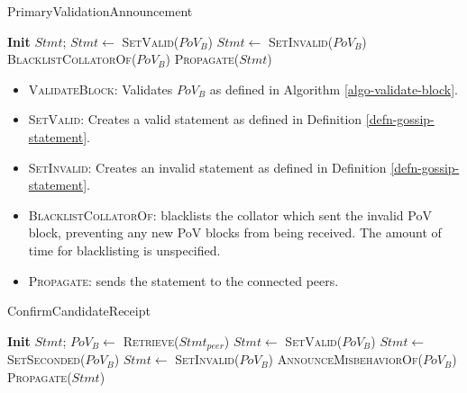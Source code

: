 \begin{algorithm}[H]
  \caption[PrimaryValidationAnnouncement]{\sc PrimaryValidationAnnouncement}
  \label{algo-primary-validation-announcement}
  \begin{algorithmic}[1]
      \State \textbf{Init} $Stmt$;
        \State $Stmt \leftarrow$ \textsc{SetValid($PoV_B$)}
      \Else
        \State $Stmt \leftarrow$ \textsc{SetInvalid($PoV_B$)}
        \State \textsc{BlacklistCollatorOf}($PoV_B$)
      \EndIf
      \State \textsc{Propagate}($Stmt$)
  \end{algorithmic}
\end{algorithm}

\begin{itemize}
  \item \textsc{ValidateBlock}: Validates $PoV_B$ as defined in Algorithm
  \ref{algo-validate-block}.
  \item \textsc{SetValid}: Creates a valid statement as defined in Definition
  \ref{defn-gossip-statement}.
  \item \textsc{SetInvalid}: Creates an invalid statement as defined in
  Definition \ref{defn-gossip-statement}.
  \item \textsc{BlacklistCollatorOf}: blacklists the collator which sent the
  invalid PoV block, preventing any new PoV blocks from being received. The
  amount of time for blacklisting is unspecified.
  \item \textsc{Propagate}: sends the statement to the connected peers.
\end{itemize}

\begin{algorithm}[H]
  \caption[]{\sc ConfirmCandidateReceipt}
  \label{algo-endorse-candidate-receipt}
  \begin{algorithmic}[1]
      \State \textbf{Init} $Stmt$;
      \State $PoV_B \leftarrow$ \textsc{Retrieve}($Stmt_{peer}$)
          \State $Stmt \leftarrow$ \textsc{SetValid($PoV_B$)}
        \Else
          \State $Stmt \leftarrow$ \textsc{SetSeconded($PoV_B$)}
        \EndIf
      \Else
        \State $Stmt \leftarrow$ \textsc{SetInvalid($PoV_B$)}
        \State \textsc{AnnounceMisbehaviorOf}($PoV_B$)
      \EndIf
      \State \textsc{Propagate}($Stmt$)
  \end{algorithmic}
\end{algorithm}

